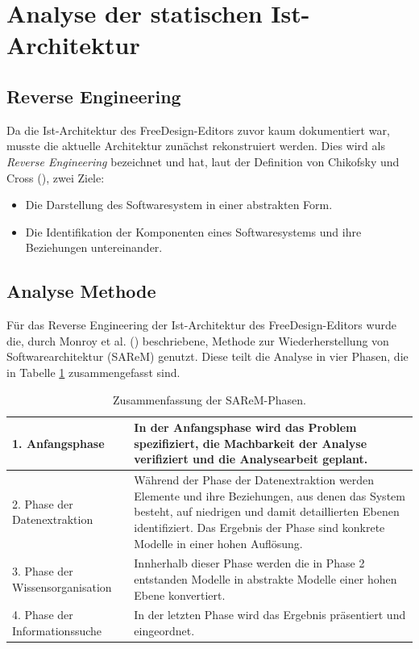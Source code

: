 

\section{Analyse der statischen Ist-Architektur}

\subsection{Reverse Engineering}
Da die Ist-Architektur des FreeDesign-Editors zuvor kaum dokumentiert war, musste die aktuelle Architektur zunächst rekonstruiert werden. 
Dies wird als \emph{Reverse Engineering} bezeichnet und hat, laut der Definition von Chikofsky und Cross (\citeyear[vgl.][S. 13-17]{Chikofsky1990}), zwei Ziele: 
\begin{itemize}
    \item Die Darstellung des Softwaresystem in einer abstrakten Form. 
    \item Die Identifikation der Komponenten eines Softwaresystems und ihre Beziehungen untereinander. 
\end{itemize}


\subsection{Analyse Methode}
Für das Reverse Engineering der Ist-Architektur des FreeDesign-Editors wurde die, durch Monroy et al. (\citeyear[vgl.][]{Monroy2018}) beschriebene, Methode zur Wiederherstellung von Softwarearchitektur (SAReM) genutzt. Diese teilt die Analyse in vier Phasen, die in Tabelle \ref{table:SAReM} zusammengefasst sind.
\begin{table}[H]
    \centering
    \caption{Zusammenfassung der SAReM-Phasen.}
    \label{table:SAReM}
    \begin{tabularx}{\columnwidth}{l|X}
        1. Anfangsphase & In der Anfangsphase wird das Problem spezifiziert, die Machbarkeit der Analyse verifiziert und die Analysearbeit geplant. \\
        \hline
        
        2. Phase der Datenextraktion & Während der Phase der Datenextraktion werden Elemente und ihre Beziehungen, aus denen das System besteht, auf niedrigen und damit detaillierten Ebenen identifiziert. Das Ergebnis der Phase sind konkrete Modelle in einer hohen Auflösung. \\
        \hline

        3. Phase der Wissensorganisation &  Innherhalb dieser Phase werden die in Phase 2 entstanden 
        Modelle in abstrakte Modelle einer hohen Ebene konvertiert.\\
        \hline

        4. Phase der Informationssuche & In der letzten Phase wird das Ergebnis präsentiert und eingeordnet. \\

    \end{tabularx}
\end{table}  

